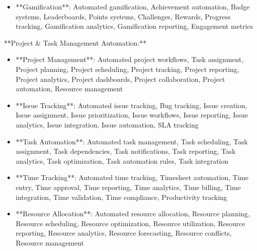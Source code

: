 \documentclass[11pt,a4paper]{article}
\begin{document}
\begin{itemize}
\item **Gamification**: Automated gamification, Achievement automation, Badge systems, Leaderboards, Points systems, Challenges, Rewards, Progress tracking, Gamification analytics, Gamification reporting, Engagement metrics
\end{itemize}

**Project \& Task Management Automation:**

\begin{itemize}
\item **Project Management**: Automated project workflows, Task assignment, Project planning, Project scheduling, Project tracking, Project reporting, Project analytics, Project dashboards, Project collaboration, Project automation, Resource management
\end{itemize}

\begin{itemize}
\item **Issue Tracking**: Automated issue tracking, Bug tracking, Issue creation, Issue assignment, Issue prioritization, Issue workflows, Issue reporting, Issue analytics, Issue integration, Issue automation, SLA tracking
\end{itemize}

\begin{itemize}
\item **Task Automation**: Automated task management, Task scheduling, Task assignment, Task dependencies, Task notifications, Task reporting, Task analytics, Task optimization, Task automation rules, Task integration
\end{itemize}

\begin{itemize}
\item **Time Tracking**: Automated time tracking, Timesheet automation, Time entry, Time approval, Time reporting, Time analytics, Time billing, Time integration, Time validation, Time compliance, Productivity tracking
\end{itemize}

\begin{itemize}
\item **Resource Allocation**: Automated resource allocation, Resource planning, Resource scheduling, Resource optimization, Resource utilization, Resource reporting, Resource analytics, Resource forecasting, Resource conflicts, Resource management
\end{itemize}
\end{document}
